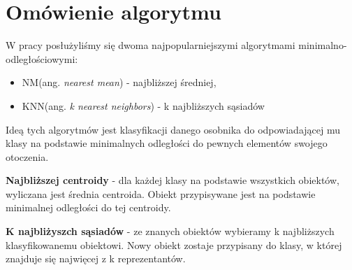 \section{Omówienie algorytmu}
	W pracy posłużyliśmy się dwoma najpopularniejszymi algorytmami minimalno-odległościowymi:
	
	\begin{itemize}
		\item NM(ang. \textit{nearest mean}) - najbliższej średniej,
		\item KNN(ang. \textit{k nearest neighbors}) - k najbliższych sąsiadów
	\end{itemize}

	Ideą tych algorytmów jest klasyfikacji danego osobnika do odpowiadającej mu klasy na podstawie minimalnych odległości do pewnych elementów swojego otoczenia.

	\textbf{Najbliższej centroidy} - dla każdej klasy na podstawie wszystkich obiektów, wyliczana jest średnia centroida. Obiekt przypisywane jest na podstawie minimalnej odległości do tej centroidy.
	
	\textbf{K najbliżyszch sąsiadów} - ze znanych obiektów wybieramy k najbliższych klasyfikowanemu obiektowi. Nowy obiekt zostaje przypisany do klasy, w której znajduje się najwięcej z k reprezentantów.
	